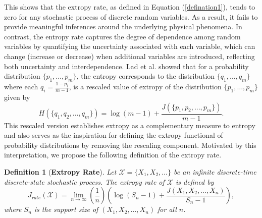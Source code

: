 \documentclass[pdflatex]{sn-jnl}%
\theoremstyle{thmstyleone}
\theoremstyle{thmstyletwo}%
\theoremstyle{thmstylethree}%
\newtheorem{definition}{Definition}%
\begin{document}
This shows that the extropy rate, as defined in Equation (\ref{defination1}), tends to zero for any stochastic process of discrete random variables. As a result, it fails to provide meaningful inferences around the underlying physical phenomena. In contrast, the entropy rate captures the degree of dependence among random variables by quantifying the uncertainty associated with each variable, which can change (increase or decrease) when additional variables are introduced, reflecting both uncertainty and interdependence. Lad et al. \cite{lad2015extropy} showed that for a probability distribution $\{p_1, \ldots, p_m\}$, the entropy corresponds to the distribution $\{q_1, \ldots, q_m\}$ where each $q_i = \frac{1 - p_i}{m - 1}$, is a rescaled value of extropy of the distribution $\{p_1, \ldots, p_m\}$ given by
\begin{equation}
H\left(\{q_1,q_2,...,q_m\}\right)=\log(m-1)+\frac{J\left(\{p_1,p_2,...,p_m\}\right)}{m-1}.
\end{equation}
This rescaled version establishes extropy as a complementary measure to entropy and also serves as the inspiration for defining the extropy functional of probability distributions by removing the rescaling component. Motivated by this interpretation, we propose the following definition of the extropy rate.
\begin{definition}[\textbf{Extropy Rate}]

Let $\bm{\mathcal{X}} = \{X_1, X_2, \dots\}$ be an infinite discrete-time discrete-state stochastic process. The extropy rate of $\bm{\mathcal{X}}$ is defined by 
\begin{equation}
    J_{rate}\left(\bm{\mathcal{X}}\right)=\lim_{n\to \infty}\left(\frac{1}{n} \right)\left(\log({S_n}-1)+\frac{J(X_1, X_2,...,X_n)}{{S_n}-1}\right),
\end{equation}
where ${S_n}$ is the support size of $(X_1,X_2,...,X_n)$ for all $n$.
\end{definition}

\end{document}
